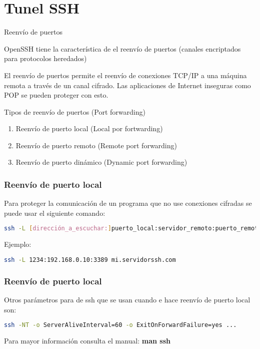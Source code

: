 \section{Tunel SSH}

\begin{frame}[c]{Reenvío de puertos}

  OpenSSH tiene la característica de el reenvío de puertos
  (canales encriptados para protocolos heredados)

  \vspace{\baselineskip}
  El reenvío de puertos permite el reenvío de conexiones TCP/IP a
  una máquina remota a través de un canal cifrado. Las aplicaciones
  de Internet inseguras como POP se pueden proteger con esto.
\end{frame}

\begin{frame}[c]{Tipos de reenvío de puertos (Port forwarding)}
  \begin{enumerate}
    \item Reenvío de puerto local (Local por fortwarding)
    \item Reenvío de puerto remoto (Remote port forwarding)
    \item Reenvío de puerto dinámico (Dynamic port forwarding)
  \end{enumerate}
\end{frame}

\begin{frame}[fragile]
  \frametitle{Reenvío de puerto local}

  Para proteger la comunicación de un programa que no use conexiones
  cifradas se puede usar el siguiente comando:

  \begin{lstlisting}[language=Bash,basicstyle={\footnotesize\ttfamily}]
ssh -L [dirección_a_escuchar:]puerto_local:servidor_remoto:puerto_remoto SERVIDOR
  \end{lstlisting}

  Ejemplo:
  \begin{lstlisting}[language=Bash]
ssh -L 1234:192.168.0.10:3389 mi.servidorssh.com
  \end{lstlisting}
\end{frame}

\begin{frame}[fragile]
  \frametitle{Reenvío de puerto local}

  Otros parámetros para de ssh que se usan cuando e hace reenvío de puerto
  local son:

  \begin{lstlisting}[language=Bash,basicstyle={\footnotesize\ttfamily}]
ssh -NT -o ServerAliveInterval=60 -o ExitOnForwardFailure=yes ...
  \end{lstlisting}

  \vspace{\baselineskip}
  Para mayor información consulta el manual: \textbf{man ssh}

\end{frame}



